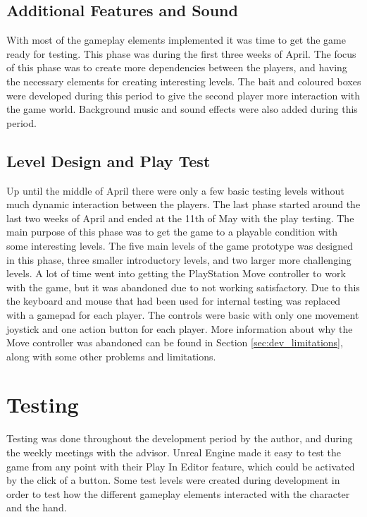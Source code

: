 \subsection{Additional Features and Sound}
With most of the gameplay elements implemented it was time to get the game ready for testing. This phase was during the first three weeks of April. The focus of this phase was to create more dependencies between the players, and having the necessary elements for creating interesting levels. The bait and coloured boxes were developed during this period to give the second player more interaction with the game world. Background music and sound effects were also added during this period.

\subsection{Level Design and Play Test}
Up until the middle of April there were only a few basic testing levels without much dynamic interaction between the players. The last phase started around the last two weeks of April and ended at the 11th of May with the play testing. The main purpose of this phase was to get the game to a playable condition with some interesting levels. The five main levels of the game prototype was designed in this phase, three smaller introductory levels, and two larger more challenging levels. A lot of time went into getting the PlayStation Move controller to work with the game, but it was abandoned due to not working satisfactory. Due to this the keyboard and mouse that had been used for internal testing was replaced with a gamepad for each player. The controls were basic with only one movement joystick and one action button for each player. More information about why the Move controller was abandoned can be found in Section \ref{sec:dev_limitations}, along with some other problems and limitations.

\section{Testing}
Testing was done throughout the development period by the author, and during the weekly meetings with the advisor. Unreal Engine made it easy to test the game from any point with their Play In Editor feature, which could be activated by the click of a button. Some test levels were created during development in order to test how the different gameplay elements interacted with the character and the hand.

